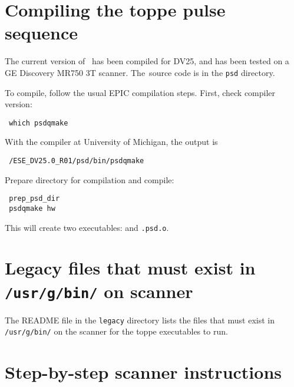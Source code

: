 

\section{Compiling the toppe pulse sequence}

The current version of \toppe~has been compiled for DV25, and has been tested on a GE Discovery MR750 3T scanner.
The\toppe~source code is in the \texttt{psd} directory.

To compile, follow the usual EPIC compilation steps.
First, check compiler version:
\vspace{-10pt}
\begin{lstlisting}
 which psdqmake
\end{lstlisting}
With the compiler at University of Michigan, the output is 
\vspace{-10pt}
\begin{lstlisting}
 /ESE_DV25.0_R01/psd/bin/psdqmake
\end{lstlisting}

Prepare directory for compilation and compile:
\vspace{-10pt}
\begin{lstlisting}
 prep_psd_dir
 psdqmake hw
\end{lstlisting}
This will create two executables: {\tt \psdname} and {\tt \psdname.psd.o}.


\section{Legacy files that must exist in \texttt{/usr/g/bin/} on scanner}

The README  file in the \texttt{legacy} directory lists the files that must exist in \texttt{/usr/g/bin/} on the scanner for the toppe executables to run.



\section{Step-by-step scanner instructions}

